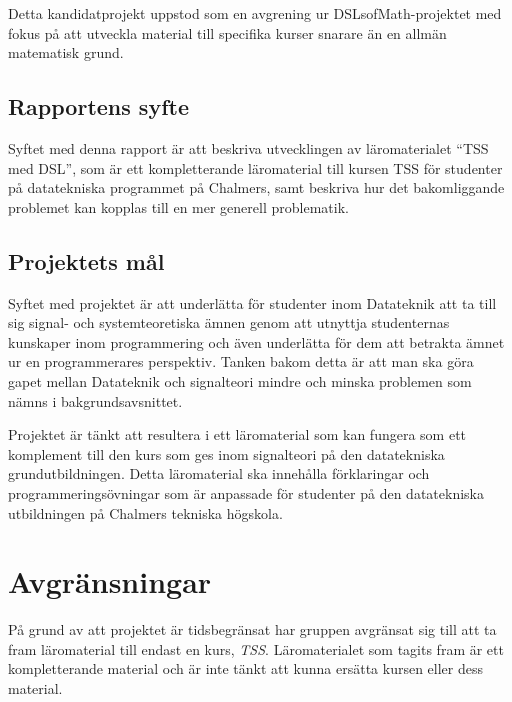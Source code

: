 \documentclass[12pt,a4paper,twoside,openright]{article}
\begin{document}
Detta kandidatprojekt uppstod som en avgrening ur DSLsofMath-projektet
med fokus på att utveckla material till specifika kurser snarare än en
allmän matematisk grund.

\subsection{Rapportens syfte}


Syftet med denna rapport är att beskriva utvecklingen av
läromaterialet ``TSS med DSL'', som är ett kompletterande läromaterial
till kursen TSS för studenter på datatekniska programmet på Chalmers,
samt beskriva hur det bakomliggande problemet kan kopplas till en mer
generell problematik.

\subsection{Projektets mål}
Syftet med projektet är att underlätta för studenter inom Datateknik
att ta till sig signal- och systemteoretiska ämnen genom att utnyttja
studenternas kunskaper inom programmering och även underlätta för dem
att betrakta ämnet ur en programmerares perspektiv. Tanken bakom detta
är att man ska göra gapet mellan Datateknik och signalteori mindre och
minska problemen som nämns i bakgrundsavsnittet.

Projektet är tänkt att resultera i ett läromaterial som kan fungera
som ett komplement till den kurs som ges inom signalteori på den
datatekniska grund\-utbildningen. Detta läromaterial ska innehålla
förklaringar och programmeringsövningar som är anpassade för studenter
på den datatekniska utbildningen på Chalmers tekniska högskola.

\section{Avgränsningar}

På grund av att projektet är tidsbegränsat har gruppen avgränsat sig
till att ta fram läromaterial till endast en kurs,
\textit{TSS}. Läromaterialet som tagits fram är ett kompletterande
material och är inte tänkt att kunna ersätta kursen eller dess
material.
\end{document}
